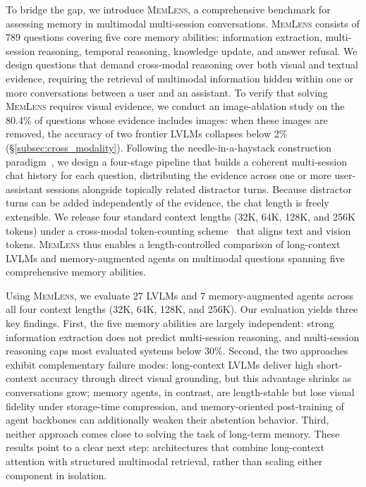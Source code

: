 \documentclass{article}
\newcommand{\bench}{\textsc{MemLens}}
\begin{document}
To bridge the gap, we introduce \bench{}, a comprehensive benchmark for assessing memory in multimodal multi-session conversations. \bench{} consists of 789 questions covering five core memory abilities: information extraction, multi-session reasoning, temporal reasoning, knowledge update, and answer refusal. We design questions that demand cross-modal reasoning over both visual and textual evidence, requiring the retrieval of multimodal information hidden within one or more conversations between a user and an assistant. To verify that solving \bench{} requires visual evidence, we conduct an image-ablation study on the 80.4\% of questions whose evidence includes images: when these images are removed, the accuracy of two frontier LVLMs collapses below 2\% (\S\ref{subsec:cross_modality}). Following the needle-in-a-haystack construction paradigm~\cite{kamradt2023needle}, we design a four-stage pipeline that builds a coherent multi-session chat history for each question, distributing the evidence across one or more user-assistant sessions alongside topically related distractor turns. Because distractor turns can be added independently of the evidence, the chat length is freely extensible. We release four standard context lengths (32K, 64K, 128K, and 256K tokens) under a cross-modal token-counting scheme~\cite{mmlongbench} that aligns text and vision tokens. \bench{} thus enables a length-controlled comparison of long-context LVLMs and memory-augmented agents on multimodal questions spanning five comprehensive memory abilities.


Using \bench{}, we evaluate 27 LVLMs and 7 memory-augmented agents across all four context lengths (32K, 64K, 128K, and 256K). Our evaluation yields three key findings. First, the five memory abilities are largely independent: strong information extraction does not predict multi-session reasoning, and multi-session reasoning caps most evaluated systems below 30\%. Second, the two approaches exhibit complementary failure modes: long-context LVLMs deliver high short-context accuracy through direct visual grounding, but this advantage shrinks as conversations grow; memory agents, in contrast, are length-stable but lose visual fidelity under storage-time compression, and memory-oriented post-training of agent backbones can additionally weaken their abstention behavior. Third, neither approach comes close to solving the task of long-term memory. These results point to a clear next step: architectures that combine long-context attention with structured multimodal retrieval, rather than scaling either component in isolation.
\end{document}
